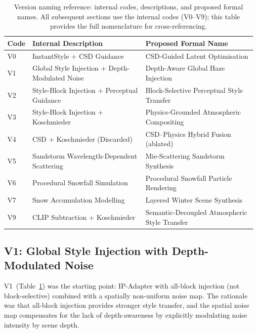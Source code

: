 \FloatBarrier
\begin{table}[htbp]
\centering
\caption{Version naming reference: internal codes, descriptions, and proposed formal names. All subsequent sections use the internal codes (V0--V9); this table provides the full nomenclature for cross-referencing.}
\label{tab:version_naming}
\small
\setlength{\tabcolsep}{5pt}
\renewcommand{\arraystretch}{1.3}
\begin{tabular}{@{}llp{6.2cm}@{}}
\toprule
\textbf{Code} & \textbf{Internal Description} & \textbf{Proposed Formal Name} \\
\midrule
V0  & InstantStyle + CSD Guidance                    & CSD-Guided Latent Optimisation \\
V1  & Global Style Injection + Depth-Modulated Noise & Depth-Aware Global Haze Injection \\
V2  & Style-Block Injection + Perceptual Guidance    & Block-Selective Perceptual Style Transfer \\
V3  & Style-Block Injection + Koschmieder            & Physics-Grounded Atmospheric Compositing \\
V4  & CSD + Koschmieder (Discarded)                  & CSD--Physics Hybrid Fusion (ablated) \\
V5  & Sandstorm Wavelength-Dependent Scattering      & Mie-Scattering Sandstorm Synthesis \\
V6  & Procedural Snowfall Simulation                 & Procedural Snowfall Particle Rendering \\
V7  & Snow Accumulation Modelling                    & Layered Winter Scene Synthesis \\
V9  & CLIP Subtraction + Koschmieder                 & Semantic-Decoupled Atmospheric Style Transfer \\
\bottomrule
\end{tabular}
\end{table}

\FloatBarrier
\subsection{V1: Global Style Injection with Depth-Modulated Noise}
\label{sec:v1}

\noindent V1~(Table~\ref{tab:version_naming}) was the starting point: IP-Adapter with all-block injection (not block-selective) combined with a spatially non-uniform noise map. The rationale was that all-block injection provides stronger style transfer, and the spatial noise map compensates for the lack of depth-awareness by explicitly modulating noise intensity by scene depth.

